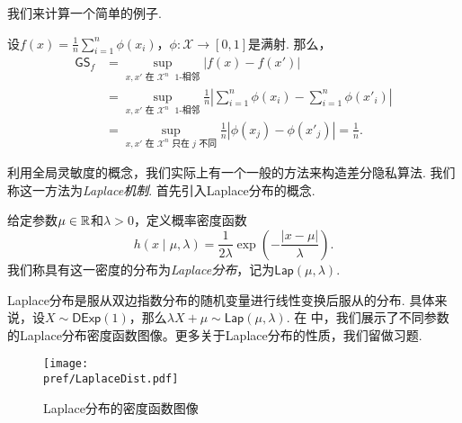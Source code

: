 我们来计算一个简单的例子.
\begin{example}
设$f(x)= \frac1n \sum_{i=1}^n \phi(x_i)$，$\phi : \mathcal X\to [0,1]$是满射. 那么，
\begin{align*}
    \mathsf{GS}_f&=\sup_{x, x' \text{ 在 }\mathcal X^n\text{ $1$-相邻}} |f(x) - f(x')|\\
    &= \sup_{x, x' \text{ 在 }\mathcal X^n\text{ $1$-相邻}} \frac1n \left|\sum_{i=1}^n \phi(x_i) - \sum_{i=1}^n \phi(x'_i)\right|\\
    &= \sup_{x, x' \text{ 在 }\mathcal X^n\text{ 只在 } j\text{ 不同}} \frac1n \left|\phi(x_j) - \phi(x'_j)\right| = \frac1n.
\end{align*}
\end{example}

利用全局灵敏度的概念，我们实际上有一个一般的方法来构造差分隐私算法. 我们称这一方法为\emph{Laplace机制}. 首先引入Laplace分布的概念.

\begin{definition}[Laplace分布]
    给定参数$\mu\in\mathbb{R}$和$\lambda>0$，定义概率密度函数
        \[h(x \mid \mu, \lambda) = \frac1{2\lambda}\exp\left(- \frac{|x - \mu|}{\lambda}\right).\]
我们称具有这一密度的分布为\emph{Laplace分布}，记为$\mathsf{Lap}(\mu,\lambda)$.
\end{definition}

Laplace分布是服从双边指数分布的随机变量进行线性变换后服从的分布. 具体来说，设$X\sim\mathsf{DExp}(1)$，那么$\lambda X+\mu\sim\mathsf{Lap}(\mu,\lambda)$. 在 中，我们展示了不同参数的Laplace分布密度函数图像。更多关于Laplace分布的性质，我们留做习题. 

\begin{figure}[ht]
    \centering
    \texttt{[image: \\pref/LaplaceDist.pdf]}
    
    \caption{Laplace分布的密度函数图像}
    \label{fig:Laplace-distribution}
\end{figure}

